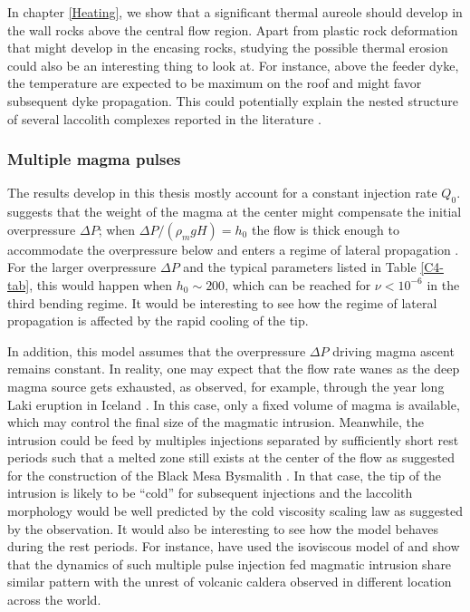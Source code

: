 In chapter \ref{Heating},  we show that a  significant thermal aureole
should develop in the wall rocks above the central flow region.  Apart
from  plastic rock  deformation  that might  develop  in the  encasing
rocks,  studying  the  possible  thermal  erosion  could  also  be  an
interesting thing to look at. For instance, above the feeder dyke, the
temperature are  expected to be  maximum on  the roof and  might favor
subsequent dyke propagation. This could potentially explain the nested
structure of  several laccolith  complexes reported in  the literature
\citep{E:2015tl,Rocchi:2010dn}.

\subsubsection*{Multiple magma pulses}
\label{sec:caref-descr-tip}

The  results develop  in this  thesis  mostly account  for a  constant
injection rate $Q_0$. \citet{Michaut:2011kg}  suggests that the weight
of the magma  at the center might compensate  the initial overpressure
$\Delta P$; when $\Delta P/(\rho_m g  H)=h_0$ the flow is thick enough
to accommodate the  overpressure below and enters a  regime of lateral
propagation  \citep{Michaut:2011kg}.   For   the  larger  overpressure
$\Delta P$  and the typical  parameters listed in  Table \ref{C4-tab},
this  would  happen when  $h_0\sim  200$,  which  can be  reached  for
$\nu<10^{-6}$ in the third bending  regime. It would be interesting to
see how  the regime of  lateral propagation  is affected by  the rapid
cooling of the tip.

In  addition, this  model  assumes that  the  overpressure $\Delta  P$
driving magma ascent remains constant. In reality, one may expect that
the  flow rate  wanes  as the  deep magma  source  gets exhausted,  as
observed, for example, through the  year long Laki eruption in Iceland
\citep{Taisne:2009va,Rivalta:2010em}.   In  this  case, only  a  fixed
volume of magma is available, which  may control the final size of the
magmatic  intrusion.   Meanwhile,  the  intrusion  could  be  feed  by
multiples injections separated by sufficiently short rest periods such
that a melted zone still exists at the center of the flow as suggested
for    the    construction    of     the    Black    Mesa    Bysmalith
\citep{Morgan:2008hj}.   In that  case, the  tip of  the intrusion  is
likely  to be  ``cold'' for  subsequent injections  and the  laccolith
morphology would be  well predicted by the cold  viscosity scaling law
as suggested by  the observation. It would also be  interesting to see
how  the  model  behaves  during  the  rest  periods.   For  instance,
\citet{Macedonio:2014et}   have   used   the   isoviscous   model   of
\citet{Michaut:2011kg}  and show  that the  dynamics of  such multiple
pulse injection fed magmatic intrusion  share similar pattern with the
unrest of volcanic  caldera observed in different  location across the
world.

